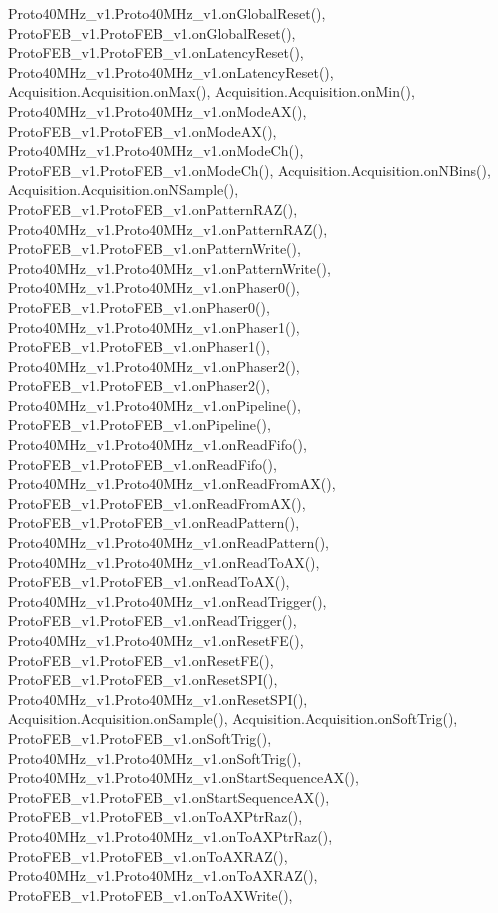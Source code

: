 Proto40\+M\+Hz\+\_\+v1.\+Proto40\+M\+Hz\+\_\+v1.\+on\+Global\+Reset(), Proto\+F\+E\+B\+\_\+v1.\+Proto\+F\+E\+B\+\_\+v1.\+on\+Global\+Reset(), Proto\+F\+E\+B\+\_\+v1.\+Proto\+F\+E\+B\+\_\+v1.\+on\+Latency\+Reset(), Proto40\+M\+Hz\+\_\+v1.\+Proto40\+M\+Hz\+\_\+v1.\+on\+Latency\+Reset(), Acquisition.\+Acquisition.\+on\+Max(), Acquisition.\+Acquisition.\+on\+Min(), Proto40\+M\+Hz\+\_\+v1.\+Proto40\+M\+Hz\+\_\+v1.\+on\+Mode\+A\+X(), Proto\+F\+E\+B\+\_\+v1.\+Proto\+F\+E\+B\+\_\+v1.\+on\+Mode\+A\+X(), Proto40\+M\+Hz\+\_\+v1.\+Proto40\+M\+Hz\+\_\+v1.\+on\+Mode\+Ch(), Proto\+F\+E\+B\+\_\+v1.\+Proto\+F\+E\+B\+\_\+v1.\+on\+Mode\+Ch(), Acquisition.\+Acquisition.\+on\+N\+Bins(), Acquisition.\+Acquisition.\+on\+N\+Sample(), Proto\+F\+E\+B\+\_\+v1.\+Proto\+F\+E\+B\+\_\+v1.\+on\+Pattern\+R\+A\+Z(), Proto40\+M\+Hz\+\_\+v1.\+Proto40\+M\+Hz\+\_\+v1.\+on\+Pattern\+R\+A\+Z(), Proto\+F\+E\+B\+\_\+v1.\+Proto\+F\+E\+B\+\_\+v1.\+on\+Pattern\+Write(), Proto40\+M\+Hz\+\_\+v1.\+Proto40\+M\+Hz\+\_\+v1.\+on\+Pattern\+Write(), Proto40\+M\+Hz\+\_\+v1.\+Proto40\+M\+Hz\+\_\+v1.\+on\+Phaser0(), Proto\+F\+E\+B\+\_\+v1.\+Proto\+F\+E\+B\+\_\+v1.\+on\+Phaser0(), Proto40\+M\+Hz\+\_\+v1.\+Proto40\+M\+Hz\+\_\+v1.\+on\+Phaser1(), Proto\+F\+E\+B\+\_\+v1.\+Proto\+F\+E\+B\+\_\+v1.\+on\+Phaser1(), Proto40\+M\+Hz\+\_\+v1.\+Proto40\+M\+Hz\+\_\+v1.\+on\+Phaser2(), Proto\+F\+E\+B\+\_\+v1.\+Proto\+F\+E\+B\+\_\+v1.\+on\+Phaser2(), Proto40\+M\+Hz\+\_\+v1.\+Proto40\+M\+Hz\+\_\+v1.\+on\+Pipeline(), Proto\+F\+E\+B\+\_\+v1.\+Proto\+F\+E\+B\+\_\+v1.\+on\+Pipeline(), Proto40\+M\+Hz\+\_\+v1.\+Proto40\+M\+Hz\+\_\+v1.\+on\+Read\+Fifo(), Proto\+F\+E\+B\+\_\+v1.\+Proto\+F\+E\+B\+\_\+v1.\+on\+Read\+Fifo(), Proto40\+M\+Hz\+\_\+v1.\+Proto40\+M\+Hz\+\_\+v1.\+on\+Read\+From\+A\+X(), Proto\+F\+E\+B\+\_\+v1.\+Proto\+F\+E\+B\+\_\+v1.\+on\+Read\+From\+A\+X(), Proto\+F\+E\+B\+\_\+v1.\+Proto\+F\+E\+B\+\_\+v1.\+on\+Read\+Pattern(), Proto40\+M\+Hz\+\_\+v1.\+Proto40\+M\+Hz\+\_\+v1.\+on\+Read\+Pattern(), Proto40\+M\+Hz\+\_\+v1.\+Proto40\+M\+Hz\+\_\+v1.\+on\+Read\+To\+A\+X(), Proto\+F\+E\+B\+\_\+v1.\+Proto\+F\+E\+B\+\_\+v1.\+on\+Read\+To\+A\+X(), Proto40\+M\+Hz\+\_\+v1.\+Proto40\+M\+Hz\+\_\+v1.\+on\+Read\+Trigger(), Proto\+F\+E\+B\+\_\+v1.\+Proto\+F\+E\+B\+\_\+v1.\+on\+Read\+Trigger(), Proto40\+M\+Hz\+\_\+v1.\+Proto40\+M\+Hz\+\_\+v1.\+on\+Reset\+F\+E(), Proto\+F\+E\+B\+\_\+v1.\+Proto\+F\+E\+B\+\_\+v1.\+on\+Reset\+F\+E(), Proto\+F\+E\+B\+\_\+v1.\+Proto\+F\+E\+B\+\_\+v1.\+on\+Reset\+S\+P\+I(), Proto40\+M\+Hz\+\_\+v1.\+Proto40\+M\+Hz\+\_\+v1.\+on\+Reset\+S\+P\+I(), Acquisition.\+Acquisition.\+on\+Sample(), Acquisition.\+Acquisition.\+on\+Soft\+Trig(), Proto\+F\+E\+B\+\_\+v1.\+Proto\+F\+E\+B\+\_\+v1.\+on\+Soft\+Trig(), Proto40\+M\+Hz\+\_\+v1.\+Proto40\+M\+Hz\+\_\+v1.\+on\+Soft\+Trig(), Proto40\+M\+Hz\+\_\+v1.\+Proto40\+M\+Hz\+\_\+v1.\+on\+Start\+Sequence\+A\+X(), Proto\+F\+E\+B\+\_\+v1.\+Proto\+F\+E\+B\+\_\+v1.\+on\+Start\+Sequence\+A\+X(), Proto\+F\+E\+B\+\_\+v1.\+Proto\+F\+E\+B\+\_\+v1.\+on\+To\+A\+X\+Ptr\+Raz(), Proto40\+M\+Hz\+\_\+v1.\+Proto40\+M\+Hz\+\_\+v1.\+on\+To\+A\+X\+Ptr\+Raz(), Proto\+F\+E\+B\+\_\+v1.\+Proto\+F\+E\+B\+\_\+v1.\+on\+To\+A\+X\+R\+A\+Z(), Proto40\+M\+Hz\+\_\+v1.\+Proto40\+M\+Hz\+\_\+v1.\+on\+To\+A\+X\+R\+A\+Z(), Proto\+F\+E\+B\+\_\+v1.\+Proto\+F\+E\+B\+\_\+v1.\+on\+To\+A\+X\+Write(), 